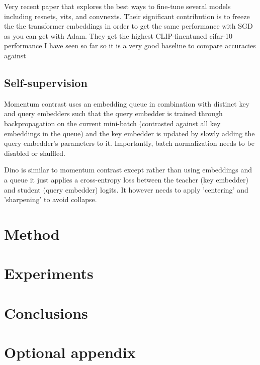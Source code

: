 \documentclass[12pt]{report}
\begin{document}
Very recent paper that explores the best ways to fine-tune several models including resnets, vits, and convnexts.
Their significant contribution is to freeze the the transformer embeddings in order to get the same performance with SGD as you can get with Adam. They get the highest CLIP-finentuned cifar-10 performance I have seen so far so it is a very good baseline to compare accuracies against~\cite{kumarHowFineTuneVision2022}

\section{Self-supervision}

Momentum contrast uses an embedding queue in combination with distinct key and query embedders such that the query embedder is trained through backpropagation on the current mini-batch (contrasted against all key embeddings in the queue) and the key embedder is updated by slowly adding the query embedder's parameters to it. Importantly, batch normalization needs to be disabled or shuffled.~\cite{heMomentumContrastUnsupervised2020}

Dino is similar to momentum contrast except rather than using embeddings and a queue it just applies a cross-entropy loss between the teacher (key embedder) and student (query embedder) logits. It however needs to apply 'centering' and 'sharpening' to avoid collapse.~\cite{caronEmergingPropertiesSelfSupervised2021a}

\chapter{Method}



\chapter{Experiments}



\chapter{Conclusions}


\appendix
\chapter{Optional appendix}

\printbibliography
\end{document}
